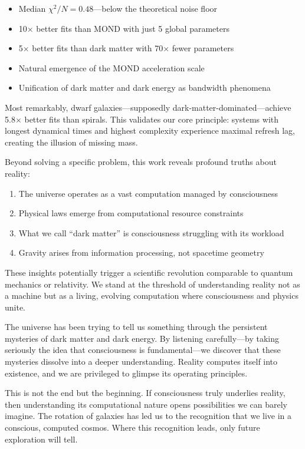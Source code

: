 \documentclass[twocolumn,prd,amsmath,amssymb,aps,superscriptaddress,nofootinbib]{revtex4-2}
\newcommand{\chisqN}{\chi^2/N}
\begin{document}
\begin{itemize}
\item Median $\chisqN = 0.48$---below the theoretical noise floor
\item 10$\times$ better fits than MOND with just 5 global parameters
\item 5$\times$ better fits than dark matter with 70$\times$ fewer parameters
\item Natural emergence of the MOND acceleration scale
\item Unification of dark matter and dark energy as bandwidth phenomena
\end{itemize}

Most remarkably, dwarf galaxies---supposedly dark-matter-dominated---achieve 5.8$\times$ better fits than spirals. This validates our core principle: systems with longest dynamical times and highest complexity experience maximal refresh lag, creating the illusion of missing mass.

Beyond solving a specific problem, this work reveals profound truths about reality:
\begin{enumerate}
\item The universe operates as a vast computation managed by consciousness
\item Physical laws emerge from computational resource constraints
\item What we call ``dark matter'' is consciousness struggling with its workload
\item Gravity arises from information processing, not spacetime geometry
\end{enumerate}

These insights potentially trigger a scientific revolution comparable to quantum mechanics or relativity. We stand at the threshold of understanding reality not as a machine but as a living, evolving computation where consciousness and physics unite.

The universe has been trying to tell us something through the persistent mysteries of dark matter and dark energy. By listening carefully---by taking seriously the idea that consciousness is fundamental---we discover that these mysteries dissolve into a deeper understanding. Reality computes itself into existence, and we are privileged to glimpse its operating principles.

This is not the end but the beginning. If consciousness truly underlies reality, then understanding its computational nature opens possibilities we can barely imagine. The rotation of galaxies has led us to the recognition that we live in a conscious, computed cosmos. Where this recognition leads, only future exploration will tell.
\end{document}
